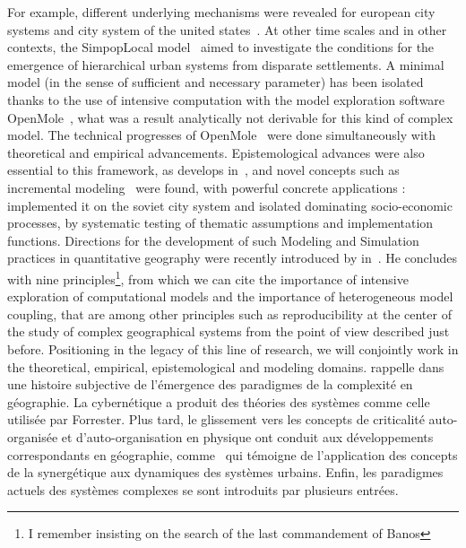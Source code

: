{ For example, different underlying mechanisms were revealed for european city systems and city system of the united states~\cite{bretagnolle2010comparer}. At other time scales and in other contexts, the SimpopLocal model~\cite{schmitt2014modelisation} aimed to investigate the conditions for the emergence of hierarchical urban systems from disparate settlements. A minimal model (in the sense of sufficient and necessary parameter) has been isolated thanks to the use of intensive computation with the model exploration software OpenMole~\cite{schmitt2014half}, what was a result analytically not derivable for this kind of complex model. The technical progresses of OpenMole~\cite{reuillon2013openmole} were done simultaneously with theoretical and empirical advancements. Epistemological advances were also essential to this framework, as  develops in~\cite{rey2015plateforme}, and novel concepts such as incremental modeling~\cite{cottineau2015incremental} were found, with powerful concrete applications : \cite{cottineau2014evolution} implemented it on the soviet city system and isolated dominating socio-economic processes, by systematic testing of thematic assumptions and implementation functions. Directions for the development of such Modeling and Simulation practices in quantitative geography were recently introduced by  in~\cite{banos2013pour}. He concludes with nine principles\footnote{I remember  insisting on the search of the last commandement of Banos}, from which we can cite the importance of intensive exploration of computational models and the importance of heterogeneous model coupling, that are among other principles such as reproducibility at the center of the study of complex geographical systems from the point of view described just before. Positioning in the legacy of this line of research, we will conjointly work in the theoretical, empirical, epistemological and modeling domains.
}{
 rappelle dans~\cite{pumain2003approche} une histoire subjective de l'émergence des paradigmes de la complexité en géographie. La cybernétique a produit des théories des systèmes comme celle utilisée par Forrester.
 Plus tard, le glissement vers les concepts de criticalité auto-organisée et d'auto-organisation en physique ont conduit aux développements correspondants en géographie, comme~\cite{sanders1992systeme} qui témoigne de l'application des concepts de la synergétique aux dynamiques des systèmes urbains. Enfin, les paradigmes actuels des systèmes complexes se sont introduits par plusieurs entrées. 
}

